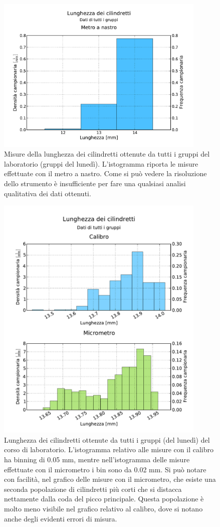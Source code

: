 \begin{figure}
	\centering
	\includegraphics[width=100mm]{grafici/cilindri_tutti.pdf}
	\caption{Misure della lunghezza dei cilindretti ottenute da tutti i gruppi del
        laboratorio (gruppi del lunedì). L'istogramma riporta le misure effettuate con
        il metro a nastro. Come si può vedere la risoluzione dello strumento è
        insufficiente per fare una qualsiasi analisi qualitativa dei dati ottenuti.}
    \label{fig:metro_tutti}
\end{figure}

\begin{figure}
	\centering
	\includegraphics[width=100mm]{grafici/cilindri_tutti_2.pdf}
    \caption{Lunghezza dei cilindretti ottenute da tutti i gruppi (del lunedì)
        del corso di laboratorio. L'istogramma relativo alle misure con il calibro
        ha binning di 0.05 mm, mentre nell'istogramma delle misure effettuate con
        il micrometro i bin sono da 0.02 mm. Si può notare con facilità, nel grafico
        delle misure con il micrometro, che esiste una seconda popolazione di
        cilindretti più corti che si distacca nettamente dalla coda del picco principale.
        Questa popolazione è molto meno visibile nel grafico relativo al calibro, dove si
        notano anche degli evidenti errori di misura.}
    \label{fig:calmic_tutti}
\end{figure}

